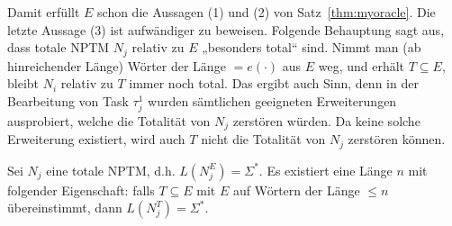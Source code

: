 Damit erfüllt $E$ schon die Aussagen (1) und (2) von Satz~\ref{thm:myoracle}. Die letzte Aussage (3) ist aufwändiger zu beweisen.
Folgende Behauptung sagt aus, dass totale NPTM $N_j$ relativ zu $E$ „besonders total“ sind. Nimmt man (ab hinreichender Länge) Wörter der Länge $=e(\cdot)$ aus $E$ weg, und erhält $T\subseteq E$, bleibt $N_i$ relativ zu $T$ immer noch total. Das ergibt auch Sinn, denn in der Bearbeitung von Task $\tau^1_j$ wurden sämtlichen geeigneten Erweiterungen ausprobiert, welche die Totalität von $N_j$ zerstören würden. Da keine solche Erweiterung existiert, wird auch $T$ nicht die Totalität von $N_j$ zerstören können.

\begin{claim}\label{claim:myoracle-totality}
    Sei $N_j$ eine totale NPTM, d.h. $L(N_j^E)=\Sigma^*$.
    Es existiert eine Länge $n$ mit folgender Eigenschaft: 
    falls $T\subseteq E$ mit $E$ auf Wörtern der Länge $\leq n$ übereinstimmt, dann $L(N_j^T)=\Sigma^*$.
\end{claim}
